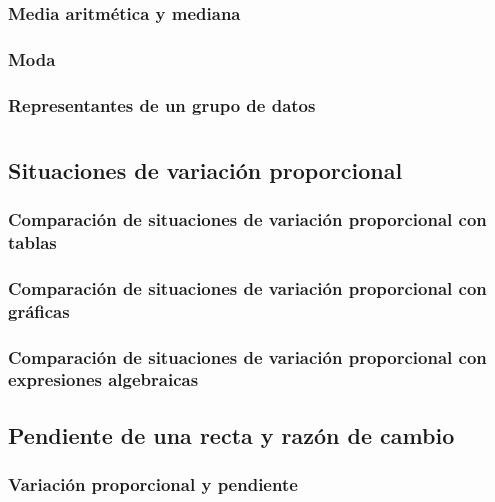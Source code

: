 \documentclass[11pt]{book}
\begin{document}
\subsection{Media aritm\'etica y mediana}

\subsection{Moda}
\subsection{Representantes de un grupo de datos}

\chapter{}

\section{Situaciones de variación proporcional}

\subsection{Comparación de situaciones de variación proporcional con tablas}

\subsection{Comparación de situaciones de variación proporcional con gráficas}

\subsection{Comparación de situaciones de variación proporcional con expresiones algebraicas}




\newpage \thispagestyle{plain}

\section{Pendiente de una recta y razón de cambio}

\subsection{Variación proporcional y pendiente}
\end{document}
